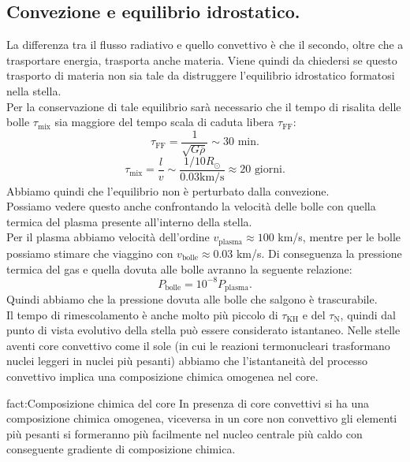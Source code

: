 \subsection{Convezione e equilibrio idrostatico.}
\label{subsec:Convezione e equilibrio idrostatico.}
La differenza tra il flusso radiativo e quello convettivo è che il secondo, oltre che a trasportare energia, trasporta anche materia. Viene quindi da chiedersi se questo trasporto di materia non sia tale da distruggere l'equilibrio idrostatico formatosi nella stella.\\
Per la conservazione di tale equilibrio sarà necessario che il tempo di risalita delle bolle $\tau_\text{mix}$ sia maggiore del tempo scala di caduta libera $\tau_\text{FF}$:
\[
	\tau_\text{FF} = \frac{1}{\sqrt{G  \overline{\rho }}} \sim 30 \text{ min}
.\] 
\[
	\tau_\text{mix} = \frac{l}{v} \sim \frac{1/10R_{\odot}}{0.03 \text{km/s}} \approx 20 \text{ giorni}
.\] 
Abbiamo quindi che l'equilibrio non è perturbato dalla convezione. \\
Possiamo vedere questo anche confrontando la velocità delle bolle con quella termica del plasma presente all'interno della stella. \\
Per il plasma abbiamo velocità dell'ordine $v_\text{plasma} \approx 100 $ km/s, mentre per le bolle possiamo stimare che viaggino con $v_\text{bolle} \approx 0.03 $ km/s. Di conseguenza la pressione termica del gas e quella dovuta alle bolle avranno la seguente relazione:
\[
	P_\text{bolle} = 10^{-8} P_\text{plasma} 
.\] 
Quindi abbiamo che la pressione dovuta alle bolle che salgono è trascurabile.\\
Il tempo di rimescolamento è anche molto più piccolo di $\tau_\text{KH}$ e del $\tau_\text{N}$, quindi dal punto di vista evolutivo della stella può essere considerato istantaneo. Nelle stelle aventi core convettivo come il sole (in cui le reazioni termonucleari trasformano nuclei leggeri in nuclei più pesanti) abbiamo che l'istantaneità del processo convettivo implica una composizione chimica omogenea nel core. 
\begin{fact}{fact:Composizione chimica del core}
	In presenza di core convettivi si ha una composizione chimica omogenea, 
	viceversa in un core non convettivo gli elementi più pesanti si 
	formeranno più facilmente nel nucleo centrale più caldo con conseguente 
	gradiente di composizione chimica.
\end{fact}
